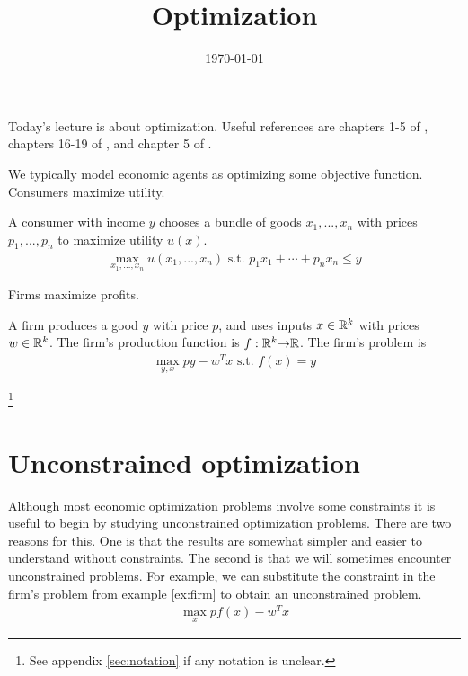  

\title{Optimization}
\date{\today}



\maketitle

Today's lecture is about optimization. Useful references are chapters
1-5 of \cite{dixit1990}, chapters 16-19 of \cite{sb1994}, and chapter
5 of \cite{carter2001}. 

We typically model economic agents as optimizing some objective
function. Consumers maximize utility.
\begin{example}
  A consumer with income $y$ chooses a bundle of goods $x_1, ...,
  x_n$ with prices $p_1, ..., p_n$ to maximize utility
  $u(x)$.
  \begin{align*}
    \max_{x_1, ..., x_n} u(x_1, ..., x_n) \text{ s.t. } p_1 x_1 +
    \cdots + p_n x_n \leq y
  \end{align*}
\end{example}
Firms maximize profits.
\begin{example}\label{ex:firm}
  A firm produces a good $y$ with price $p$, and
  uses inputs $x \in \mathbb{R}^k$ with prices $w \in \mathbb{R}^k$. The firm's
  production function is $f: \mathbb{R}^k {\rightarrow} \mathbb{R}$. The firm's problem is
  \begin{align*}
    \max_{y,x} py - w^T x \text{ s.t. } f(x) = y 
  \end{align*}
\end{example}
\footnote{See appendix \ref{sec:notation} if any notation is unclear.}

\section{Unconstrained optimization}

Although most economic optimization problems involve some constraints
it is useful to begin by studying unconstrained optimization
problems. There are two reasons for this. One is that the results are
somewhat simpler and easier to understand without constraints. The
second is that we will sometimes encounter unconstrained problems. For
example, we can substitute the constraint in the firm's problem from
example \ref{ex:firm} to obtain an unconstrained problem.
\begin{align*}
  \max_{x} pf(x) - w^T x 
\end{align*}

